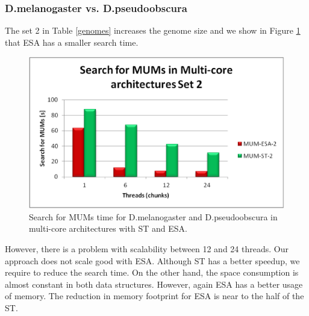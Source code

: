 \documentclass[runningheads,a4paper]{llncs}
\begin{document}
\subsubsection{D.melanogaster vs. D.pseudoobscura}
The set 2 in Table \ref{genomes} increases the genome size and we show in Figure \ref{fig:fly-mum} that ESA has a smaller search time.
 \begin{figure}[H]
  \centering
  \includegraphics[scale=0.3]{fly-MUM.eps}
  \caption{Search for MUMs time for D.melanogaster and D.pseudoobscura in multi-core architectures with ST and ESA.}
  \label{fig:fly-mum}
\end{figure}  
However, there is a problem with scalability between 12 and 24 threads. Our approach does not scale good with ESA. Although ST has a better speedup, we require to reduce the search time.
On the other hand, the space consumption is almost constant in both data structures. However, again ESA has a better usage of memory. The reduction in memory footprint for ESA is near to the half of the ST.%
\end{document}
